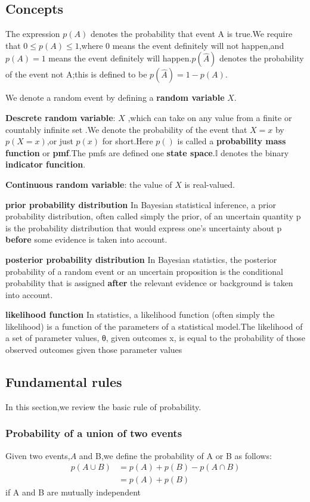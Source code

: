 \subsection{Concepts}
The expression $p(A)$ denotes the probability that event A is true.We require that $0\leq p(A) \leq 1$,where 0 means the event definitely will not happen,and $p(A)=1$ means the event definitely will happen.$p(\hat{A})$ denotes the probability of the event not A;this is defined to be $p(\hat{A})=1-p(A)$.

We denote a random event by defining a \textbf{random variable} $X$.

\textbf{Descrete random variable}: $X$ ,which can take on any value from a finite or countably infinite set .We denote the probability of the event that $X=x$ by $p(X=x)$,or just $p(x)$ for short.Here $p()$ is called a \textbf{probability mass function} or \textbf{pmf}.The pmfs are defined one \textbf{state space}.$\mathbb{I}$ denotes the binary \textbf{indicator funcition}.

\textbf{Continuous random variable}: the value of $X$ is real-valued.

\textbf{prior probability distribution}
In Bayesian statistical inference, a prior probability distribution, often called simply the prior, of an uncertain quantity p is the probability distribution that would express one's uncertainty about p \textbf{before} some evidence is taken into account.

\textbf{posterior probability distribution}
In Bayesian statistics, the posterior probability of a random event or an uncertain proposition is the conditional probability that is assigned \textbf{after} the relevant evidence or background is taken into account.

\textbf{likelihood function}
In statistics, a likelihood function (often simply the likelihood) is a function of the parameters of a statistical model.The likelihood of a set of parameter values, θ, given outcomes x, is equal to the probability of those observed outcomes given those parameter values

\subsection{Fundamental rules}
In this section,we review the basic rule of probability.
\subsubsection{Probability of a union of two events}
Given two events,$A$ and B,we define the probability of A or B as follows:
\begin{align}
p(A\cup B)& = p(A) + p(B) - p(A\cap B)	\\
		  & = p(A) + p(B)
\end{align}
if A and B are mutually independent 


